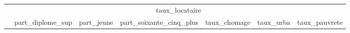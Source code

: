 {
\def\sym#1{\ifmmode^{#1}\else\(^{#1}\)\fi}
\begin{tabular}{l*{1}{cccccc}}
\hline\hline
            &\multicolumn{6}{c}{taux\_locataire}                                           \\
            &part\_diplome\_sup&  part\_jeune&part\_soixante\_cinq\_plus&taux\_chomage&   taux\_urba&taux\_pauvrete\\
\hline
\hline\hline
\end{tabular}
}
